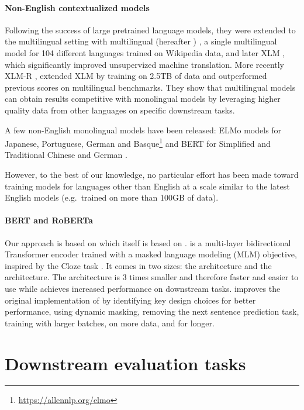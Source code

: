 \paragraph{Non-English contextualized models}
\label{contextualmodelsforotherlanguages}
Following the success of large pretrained language models, they were extended to the multilingual setting with multilingual \bert (hereafter \mbert) \cite{devlin-etal-2019-bert}, a single multilingual model for 104 different languages trained on Wikipedia data, and later XLM \cite{conneau-lample-2019-cross}, which significantly improved unsupervized machine translation.
More recently XLM-R \cite{conneau-etal-2020-unsupervised}, extended XLM by training on 2.5TB of data and outperformed previous scores on multilingual benchmarks. They show that multilingual models can obtain results competitive with monolingual models by leveraging higher quality data from other languages on specific downstream tasks.

A few non-English monolingual models have been released: ELMo models for Japanese, Portuguese, German and Basque\footnote{\url{https://allennlp.org/elmo}} and BERT for Simplified and Traditional Chinese \cite{devlin-etal-2019-bert} and German \cite{chan-etal-2019-german}.

However, to the best of our knowledge, no particular effort has been made toward training models for languages other than English at a scale similar to the latest English models (e.g.~\roberta trained on more than 100GB of data).

\paragraph{BERT and RoBERTa}
Our approach is based on \roberta \cite{liu-etal-2019-roberta} which itself is based on \bert \cite{devlin-etal-2019-bert}.
\bert is a multi-layer bidirectional Transformer encoder trained with a masked language modeling (MLM) objective, inspired by the Cloze task \cite{taylor1953cloze}.
It comes in two sizes: the \bertbase architecture and the \bertlarge architecture. The \bertbase architecture is 3 times smaller and therefore faster and easier to use while \bertlarge achieves increased performance on downstream tasks.
\roberta improves the original implementation of \bert by identifying key design choices for better performance, using dynamic masking, removing the next sentence prediction task, training with larger batches, on more data, and for longer.


\section{Downstream evaluation tasks}

